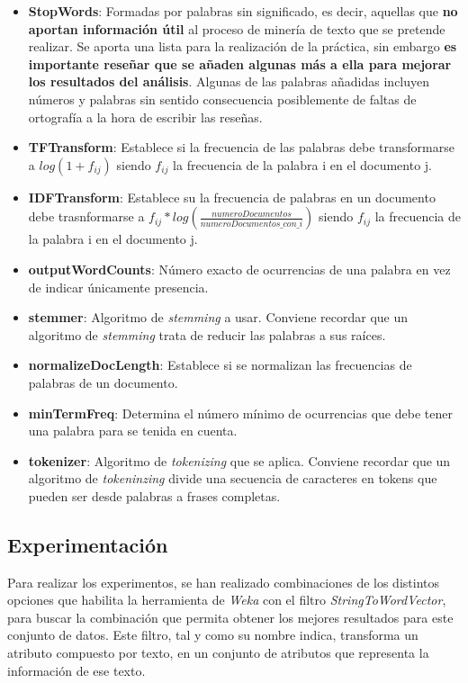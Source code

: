 \documentclass[12pt,a4paper, xcolor=table]{article}
\begin{document}
          \begin{itemize}
          \item \textbf{StopWords}: Formadas por palabras sin significado, es decir, aquellas que \textbf{no aportan información útil} al proceso de minería de texto que se pretende realizar. Se aporta una lista para la realización de la práctica, sin embargo \textbf{es importante reseñar que se añaden algunas más a ella para mejorar los resultados del análisis}. Algunas de las palabras añadidas incluyen números y palabras sin sentido consecuencia posiblemente de faltas de ortografía a la hora de escribir las reseñas.

          \item \textbf{TFTransform}: Establece si la frecuencia de las palabras debe transformarse a $log(1+f_{ij})$ siendo $f_{ij}$ la frecuencia de la palabra i en el documento j.
          \item \textbf{IDFTransform}: Establece su la frecuencia de palabras en un documento debe trasnformarse a $f_{ij} * log(\frac{numeroDocumentos}{numeroDocumentos\_con\_i})$ siendo $f_{ij}$ la frecuencia de la palabra i en el documento j.
          \item \textbf{outputWordCounts}: Número exacto de ocurrencias de una palabra en vez de indicar únicamente presencia.
          \item \textbf{stemmer}: Algoritmo de \textit{stemming} a usar. Conviene recordar que un algoritmo de \textit{stemming} trata de reducir las palabras a sus raíces.
          \item \textbf{normalizeDocLength}: Establece si se normalizan las frecuencias de palabras de un documento.
          \item \textbf{minTermFreq}: Determina el número mínimo de ocurrencias que debe tener una palabra para se tenida en cuenta.
          \item \textbf{tokenizer}: Algoritmo de \textit{tokenizing} que se aplica. Conviene recordar que un algoritmo de \textit{tokeninzing} divide una secuencia de caracteres en tokens que pueden ser desde palabras a frases completas.

          \end{itemize}

      \subsection{Experimentación}
        Para realizar los experimentos, se han realizado combinaciones de los distintos opciones que habilita la herramienta de \textit{Weka} con el filtro \textit{StringToWordVector}, para buscar la combinación que permita obtener los mejores resultados para este conjunto de datos. Este filtro, tal y como su nombre indica, transforma un atributo compuesto por texto, en un conjunto de atributos que representa la información de ese texto.
\end{document}

